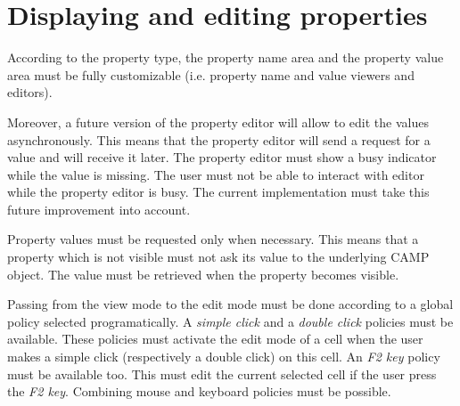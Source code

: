 \documentclass[a4paper, twoside]{report}
\begin{document}
\section{Displaying and editing properties}


According to the property type, the property name area and the property value area must be fully
customizable (i.e. property name and value viewers and editors).

Moreover, a future version of the property editor will allow to edit the values asynchronously. This
means that the property editor will send a request for a value and will receive it later. The property
editor must show a busy indicator while the value is missing. The user must not be able to interact
with editor while the property editor is busy. The current implementation must take this future
improvement into account.

Property values must be requested only when necessary. This means that a property which is not visible
must not ask its value to the underlying CAMP object. The value must be retrieved when the property
becomes visible.

Passing from the view mode to the edit mode must be done according to a global policy selected
programatically. A \emph{simple click} and a \emph{double click} policies must be available. These
policies must activate the edit mode of a cell when the user makes a simple click (respectively a
double click) on this cell. An \emph{F2 key} policy must be available too. This must edit the
current selected cell if the user press the \emph{F2 key}. Combining mouse and keyboard policies
must be possible.
\end{document}
